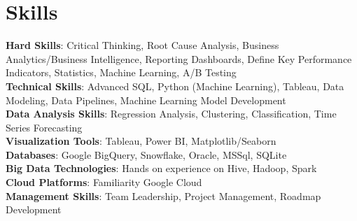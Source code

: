 \section{Skills}
  \begin{itemize}[leftmargin=0.1in, label={}]
    \normalsize{\item{
      \textbf{Hard Skills}: Critical Thinking, Root Cause Analysis, Business Analytics/Business Intelligence, Reporting Dashboards, Define Key Performance Indicators, Statistics, Machine Learning, A/B Testing \\
      \textbf{Technical Skills}: Advanced SQL, Python (Machine Learning), Tableau, Data Modeling, Data Pipelines, Machine Learning Model Development \\
      \textbf{Data Analysis Skills}: Regression Analysis, Clustering, Classification, Time Series Forecasting \\
      \textbf{Visualization Tools}: Tableau, Power BI, Matplotlib/Seaborn \\
      \textbf{Databases}: Google BigQuery, Snowflake, Oracle, MSSql, SQLite \\
      \textbf{Big Data Technologies}: Hands on experience on Hive, Hadoop, Spark \\
      \textbf{Cloud Platforms}: Familiarity Google Cloud \\
      \textbf{Management Skills}: Team Leadership, Project Management, Roadmap Development \\
     }}
  \end{itemize}

